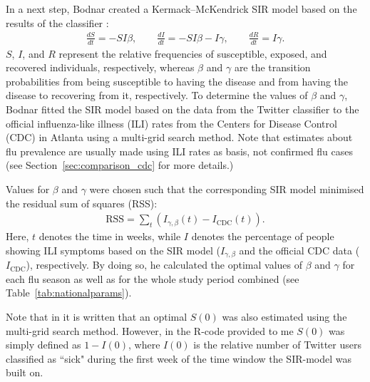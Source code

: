 \documentclass[11pt, a4paper,twoside]{report}\usepackage[]{graphicx}\usepackage[]{color}
\begin{document}
In a next step, Bodnar created a Kermack--McKendrick SIR model based on the results of the classifier \citep{martcheva2015introduction}:
\begin{align}
\frac{dS}{dt} = -SI\beta, \qquad \frac{dI}{dt} = -SI\beta - I\gamma, \qquad \frac{dR}{dt} = I\gamma. \label{eq:0}
\end{align}
$S$, $I$, and $R$ represent the relative frequencies of susceptible, exposed, and recovered individuals, respectively, whereas $\beta$ and $\gamma$ are the transition probabilities from being susceptible to having the disease and from having the disease to recovering from it, respectively. To determine the values of $\beta$ and $\gamma$, Bodnar fitted the SIR model based on the data from the Twitter classifier to the official influenza-like illness (ILI) rates from the Centers for Disease Control (CDC) in Atlanta using a multi-grid search method. Note that estimates about flu prevalence are usually made using ILI rates as basis, not confirmed flu cases (see Section~\ref{sec:comparison_cdc} for more details.)

Values for $\beta$ and $\gamma$ were chosen such that the corresponding SIR model minimised the residual sum of squares (RSS):
  \begin{align}
\text{RSS} = \sum_{t}(I_{\gamma, \beta}(t)-I_{\text{CDC}}(t)). \label{eq:1}
  \end{align}
Here, $t$ denotes the time in weeks, while $I$ denotes the percentage of people showing ILI symptoms based on the SIR model ($I_{\gamma, \beta}$ and the official CDC data ($I_{\text{CDC}}$), respectively. By doing so, he calculated the optimal values of $\beta$ and $\gamma$ for each flu season as well as for the whole study period combined (see Table~\ref{tab:nationalparams}). 

Note that in \cite{bodnar_data_2015} it is written that an optimal $S(0)$ was also estimated using the multi-grid search method. However, in the R-code provided to me $S(0)$ was simply defined as $1-I(0)$, where $I(0)$ is the relative number of Twitter users classified as ``sick" during the first week of the time window the SIR-model was built on.
\end{document}
